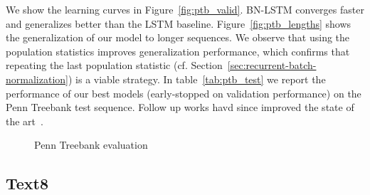 \documentclass{article} %
\begin{document}
We show the learning curves in Figure~\ref{fig:ptb_valid}.  BN-LSTM converges
faster and generalizes better than the LSTM baseline.
Figure~\ref{fig:ptb_lengths} shows the generalization of our model to longer
sequences.  We observe that using the population statistics improves
generalization performance, which confirms that repeating the last population
statistic (cf. Section~\ref{sec:recurrent-batch-normalization}) is a viable
strategy.  In table~\ref{tab:ptb_test} we report the performance of our best
models (early-stopped on validation performance) on the Penn Treebank test
sequence.  Follow up works havd since improved the state of the
art~\citep{krueger2016zoneout,chung2016hierarchical,ha2016hypernetworks}.

\begin{figure}[!hb]
  \center%
  \hspace{2mm}%
  \caption{Penn Treebank evaluation}
  \label{fig:ptb}
\end{figure}

\subsection{Text8}
\end{document}
